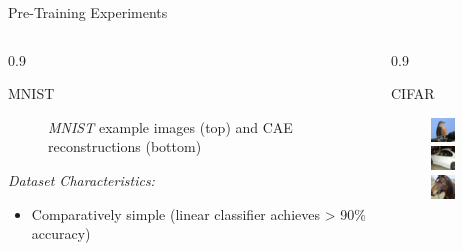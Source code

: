 \documentclass[final]{beamer}
\newlength{\onecolwid}
\newlength{\threecolwid}
\begin{document}
\begin{frame}[t]
\begin{columns}[t]
\begin{column}{\threecolwid}
\begin{alertblock}{Pre-Training Experiments}
\begin{columns}[t, totalwidth=0.9\threecolwid]
\begin{column}{0.9\onecolwid}
\begin{block}{MNIST}
\begin{figure}
	\caption{\emph{MNIST} example images (top) and CAE reconstructions (bottom)}

	\end{figure}

	\emph{Dataset Characteristics:}

	\begin{itemize}
		\item Comparatively simple (linear classifier achieves > 90\% accuracy)
	\end{itemize}

	\end{block}
	\end{column}

	\begin{column}{0.9\onecolwid}
	\begin{block}{CIFAR}
	\begin{figure}
	\centering
	\includegraphics[width=0.2\linewidth]{graphics/reconstructions/cifar/input_00.png}
	\includegraphics[width=0.2\linewidth]{graphics/reconstructions/cifar/input_01.png}
	\includegraphics[width=0.2\linewidth]{graphics/reconstructions/cifar/input_02.png}


\end{figure}
\end{block}
\end{column}
\end{columns}
\end{alertblock}
\end{column}
\end{columns}
\end{frame}
\end{document}
